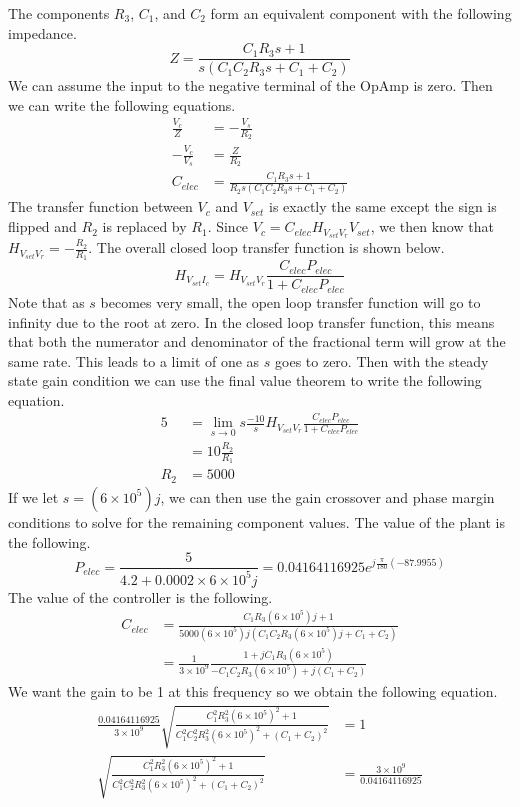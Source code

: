 \documentclass[12pt]{article}
\begin{document}
The components \(R_3\), \(C_1\), and \(C_2\) form an equivalent component with the following
impedance.
\[Z=\frac{C_1R_3s + 1}{s(C_1C_2R_3s + C_1 + C_2)}\]
We can assume the input to the negative terminal of the OpAmp is zero. Then we can write
the following equations.
\begin{align*}
    \frac{V_c}{Z}&=-\frac{V_s}{R_2}\\
    -\frac{V_c}{V_s}&=\frac{Z}{R_2}\\
    C_{elec} &=\frac{C_1R_3s + 1}{R_2s(C_1C_2R_3s + C_1 + C_2)}
\end{align*}
The transfer function between \(V_c\) and \(V_{set}\) is exactly the same
except the sign is flipped and \(R_2\) is replaced by \(R_1\). Since
\(V_c=C_{elec}H_{V_{set}V_r}V_{set}\), we then know that \(H_{V_{set}V_r}=-\frac{R_2}{R_1}\).
The overall closed loop transfer function is shown below.
\[H_{V_{set}I_c}=H_{V_{set}V_r}\frac{C_{elec}P_{elec}}{1+C_{elec}P_{elec}}\]
Note that as \(s\) becomes very small, the open loop transfer function will go to infinity due to the
root at zero. In the closed loop transfer function, this means that both the numerator and denominator
of the fractional term will grow at the same rate. This leads to a limit of one as \(s\) goes to zero.
Then with the steady state gain condition we can use the final value theorem to write the following equation.
\begin{align*}
    5&=\lim_{s\to 0} s\frac{-10}{s}H_{V_{set}V_r}\frac{C_{elec}P_{elec}}{1+C_{elec}P_{elec}}\\
    &=10\frac{R_2}{R_1}\\
    R_2&=5000
\end{align*}
If we let \(s=(6\times 10^5)j\), we can then use the gain crossover and phase margin conditions to solve for
the remaining component values. The value of the plant is the following.
\[P_{elec}=\frac{5}{4.2 + 0.0002\times6\times 10^5j}=0.04164116925e^{j\frac{\pi}{180}(-87.9955)}\]
The value of the controller is the following.
\begin{align*}
    C_{elec} &=\frac{C_1R_3(6\times 10^5)j + 1}{5000(6\times 10^5)j(C_1C_2R_3(6\times 10^5)j + C_1 + C_2)}\\
    &=\frac{1}{3\times10^9}\frac{1+jC_1R_3(6\times 10^5)}{-C_1C_2R_3(6\times 10^5)+j(C_1+C_2)}
\end{align*}
We want the gain to be 1 at this frequency so we obtain the following equation.
\begin{align*}
    \frac{0.04164116925}{3\times10^9}\sqrt{\frac{C_1^2R_3^2(6\times 10^5)^2 + 1}{C_1^2C_2^2R_3^2(6\times 10^5)^2 + (C_1+C_2)^2}} &=1\\
    \sqrt{\frac{C_1^2R_3^2(6\times 10^5)^2 + 1}{C_1^2C_2^2R_3^2(6\times 10^5)^2 + (C_1+C_2)^2}}&=\frac{3\times10^9}{0.04164116925}
\end{align*}
\end{document}
